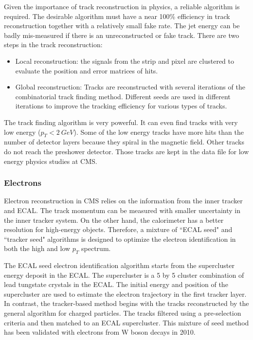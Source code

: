 Given the importance of track reconstruction in physics, a reliable algorithm is required. The desirable algorithm must have a near 100\% efficiency in track reconstruction together with a relatively small fake rate. The jet energy can be badly mis-measured if there is an unreconstructed or fake track.
There are two steps in the track reconstruction: 
\begin{itemize}
\item Local reconstruction: the signals from the strip and pixel are clustered to evaluate the position and error matrices of hits.
\item Global reconstruction: Tracks are reconstructed with several iterations of the combinatorial track finding method\cite{Adam:2005cg}. Different seeds are used in different iterations to improve the tracking efficiency for various types of tracks.
\end{itemize}
The track finding algorithm is very powerful. It can even find tracks with very low energy ($p_{T}<2~GeV$). Some of the low energy tracks have more hits than the number of detector layers because they spiral in the magnetic field. Other tracks do not reach the preshower detector. Those tracks are kept in the data file for low energy physics studies at CMS. 

\subsubsection{Electrons}
Electron reconstruction in CMS relies on the information from the inner tracker and ECAL. The track momentum can be measured with smaller uncertainty in the inner tracker system. On the other hand, the calorimeter has a better resolution for high-energy objects. Therefore, a mixture of ``ECAL seed" and ``tracker seed" algorithms is designed to optimize the electron identification in both the high and low $p_{T}$ spectrum. 

The ECAL seed electron identification algorithm starts from the supercluster energy deposit in the ECAL. The supercluster is a 5 by 5 cluster combination of lead tungstate crystals in the ECAL. The initial energy and position of the supercluster are used to estimate the electron trajectory in the first tracker layer. In contrast, the tracker-based method begins with the tracks reconstructed by the general algorithm for charged particles. The tracks filtered using a pre-selection criteria and then matched to an ECAL supercluster. This mixture of seed method has been validated with electrons from W boson decays in 2010\cite{Khachatryan:2015hwa}. 

